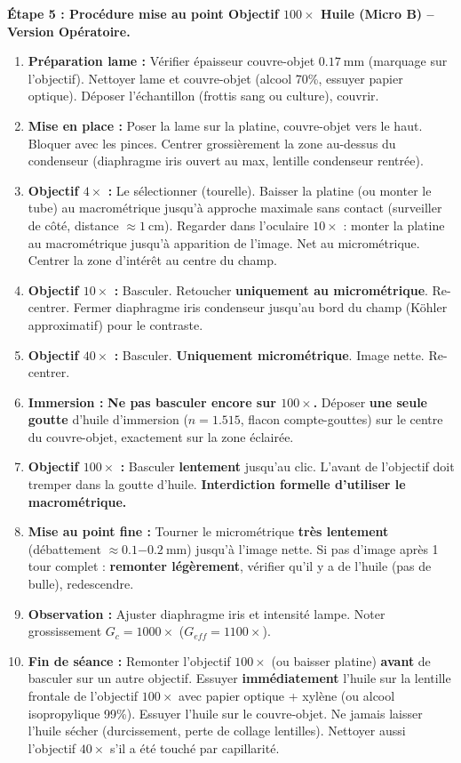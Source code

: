 \documentclass[11pt]{article}
\begin{document}
\begin{exoresolu}
\medskip
\noindent \textbf{Étape 5 : Procédure mise au point Objectif $100\times$ Huile (Micro B) -- Version Opératoire.}
\begin{enumerate}
    \item \textbf{Préparation lame :} Vérifier épaisseur couvre-objet $\SI{0,17}{\mm}$ (marquage sur l'objectif). Nettoyer lame et couvre-objet (alcool 70\%, essuyer papier optique). Déposer l'échantillon (frottis sang ou culture), couvrir.
    \item \textbf{Mise en place :} Poser la lame sur la platine, couvre-objet vers le haut. Bloquer avec les pinces. Centrer grossièrement la zone au-dessus du condenseur (diaphragme iris ouvert au max, lentille condenseur rentrée).
    \item \textbf{Objectif $4\times$ :} Le sélectionner (tourelle). Baisser la platine (ou monter le tube) au macrométrique jusqu'à approche maximale sans contact (surveiller de côté, distance $\approx \SI{1}{\cm}$). Regarder dans l'oculaire $10\times$ : monter la platine au macrométrique jusqu'à apparition de l'image. Net au micrométrique. Centrer la zone d'intérêt au centre du champ.
    \item \textbf{Objectif $10\times$ :} Basculer. Retoucher \textbf{uniquement au micrométrique}. Re-centrer. Fermer diaphragme iris condenseur jusqu'au bord du champ (Köhler approximatif) pour le contraste.
    \item \textbf{Objectif $40\times$ :} Basculer. \textbf{Uniquement micrométrique}. Image nette. Re-centrer.
    \item \textbf{Immersion :} \textbf{Ne pas basculer encore sur $100\times$.} Déposer \textbf{une seule goutte} d'huile d'immersion ($n=\num{1,515}$, flacon compte-gouttes) sur le centre du couvre-objet, exactement sur la zone éclairée.
    \item \textbf{Objectif $100\times$ :} Basculer \textbf{lentement} jusqu'au clic. L'avant de l'objectif doit tremper dans la goutte d'huile. \textbf{Interdiction formelle d'utiliser le macrométrique.}
    \item \textbf{Mise au point fine :} Tourner le micrométrique \textbf{très lentement} (débattement $\approx \SI{0,1-0,2}{\mm}$) jusqu'à l'image nette. Si pas d'image après 1 tour complet : \textbf{remonter légèrement}, vérifier qu'il y a de l'huile (pas de bulle), redescendre.
    \item \textbf{Observation :} Ajuster diaphragme iris et intensité lampe. Noter grossissement $G_c = 1000\times$ ($G_{eff}=1100\times$).
    \item \textbf{Fin de séance :} Remonter l'objectif $100\times$ (ou baisser platine) \textbf{avant} de basculer sur un autre objectif. Essuyer \textbf{immédiatement} l'huile sur la lentille frontale de l'objectif $100\times$ avec papier optique + xylène (ou alcool isopropylique 99\%). Essuyer l'huile sur le couvre-objet. Ne jamais laisser l'huile sécher (durcissement, perte de collage lentilles). Nettoyer aussi l'objectif $40\times$ s'il a été touché par capillarité.
\end{enumerate}


\end{exoresolu}
\end{document}
